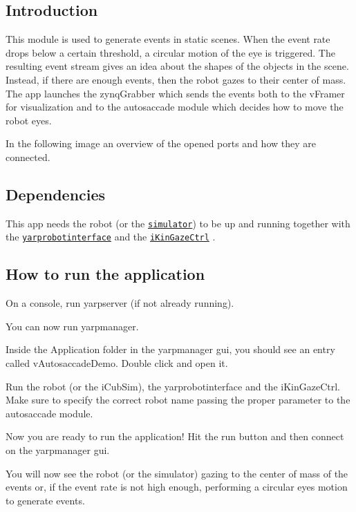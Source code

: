 \subsection*{Introduction }

This module is used to generate events in static scenes. When the event rate drops below a certain threshold, a circular motion of the eye is triggered. The resulting event stream gives an idea about the shapes of the objects in the scene. Instead, if there are enough events, then the robot gazes to their center of mass. The app launches the zynq\+Grabber which sends the events both to the v\+Framer for visualization and to the autosaccade module which decides how to move the robot eyes.

In the following image an overview of the opened ports and how they are connected.



\subsection*{Dependencies }

This app needs the robot (or the \href{http://wiki.icub.org/brain/group__icub__Simulation.html}{\tt simulator}) to be up and running together with the \href{http://www.yarp.it/yarprobotinterface.html}{\tt yarprobotinterface} and the \href{http://wiki.icub.org/brain/group__iKinGazeCtrl.html}{\tt i\+Kin\+Gaze\+Ctrl} .

\subsection*{How to run the application }

On a console, run yarpserver (if not already running).

You can now run yarpmanager.

Inside the Application folder in the yarpmanager gui, you should see an entry called v\+Autosaccade\+Demo. Double click and open it.

Run the robot (or the i\+Cub\+Sim), the yarprobotinterface and the i\+Kin\+Gaze\+Ctrl. Make sure to specify the correct robot name passing the proper parameter to the autosaccade module.

Now you are ready to run the application! Hit the run button and then connect on the yarpmanager gui.

You will now see the robot (or the simulator) gazing to the center of mass of the events or, if the event rate is not high enough, performing a circular eyes motion to generate events. 